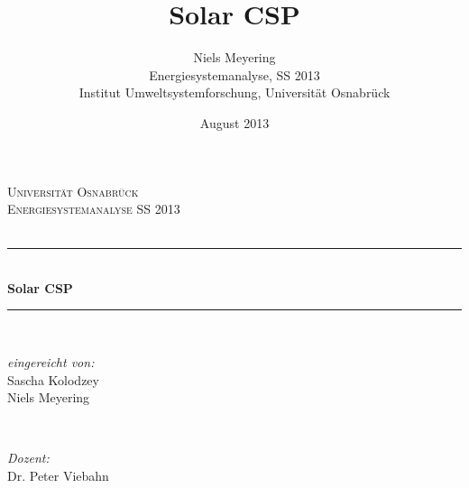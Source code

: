 \documentclass[12pt]{article}
\begin{document}
\title{Solar CSP}
\author{Niels Meyering\\ Energiesystemanalyse, SS 2013\\ Institut Umweltsystemforschung, Universität Osnabrück}
\date{August 2013}

\begin{titlepage}

\newcommand{\HRule}{\rule{\linewidth}{0.5mm}} %

\center %
 

\textsc{\LARGE Universität Osnabrück}\\[1.5cm] %
\textsc{\Large Energiesystemanalyse SS 2013}\\[0.5cm] %
\textsc{\large }\\[0.5cm] %


\HRule \\[0.4cm]
{ \huge \bfseries Solar CSP }\\[0.4cm] %
\HRule \\[1.5cm]
 

\begin{minipage}{0.3\textwidth}
\begin{flushleft} \large
\emph{eingereicht von:}\\
Sascha Kolodzey\\
Niels Meyering
\end{flushleft}
\end{minipage}
~
\begin{minipage}{0.6\textwidth}
\begin{flushright} \large
\emph{Dozent:} \\
Dr. Peter Viebahn\\
\end{flushright}
\end{minipage}\\[4cm]


\end{titlepage}
\end{document}
